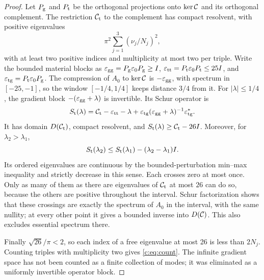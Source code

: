 \begin{proof}
Let $P_{\rm g}$ and $P_{\rm t}$ be the orthogonal projections onto $\ker\mathcal C$ and its
orthogonal complement. The restriction $\mathcal C_{\rm t}$ to the complement has compact resolvent, with positive eigenvalues
\[
 \pi^2\sum_{j=1}^3(\nu_j/N_j)^2,
\]
with at least two positive indices and multiplicity at most two per
triple. Write the bounded material blocks as
$\varepsilon_{\rm gg}=P_{\rm g}\varepsilon_0P_{\rm g}\ge I$, $\varepsilon_{\rm tt}=P_{\rm t}\varepsilon_0P_{\rm t}\le25I$, and
$\varepsilon_{\rm tg}=P_{\rm t}\varepsilon_0P_{\rm g}$. The compression of $A_0$ to $\ker\mathcal C$ is
$-\varepsilon_{\rm gg}$, with spectrum in $[-25,-1]$, so the window $[-1/4,1/4]$ keeps
distance $3/4$ from it. For $|\lambda|\le1/4$, the gradient block
$-(\varepsilon_{\rm gg}+\lambda)$ is invertible. Its Schur operator is
\begin{equation}
 S_{\rm t}(\lambda)=\mathcal C_{\rm t}-\varepsilon_{\rm tt}-\lambda+\varepsilon_{\rm tg}(\varepsilon_{\rm gg}+\lambda)^{-1}\varepsilon_{\rm tg}^*.
                                                               \label{c:eq:transverseschur}
\end{equation}
It has domain $D(\mathcal C_{\rm t})$, compact resolvent, and
$S_{\rm t}(\lambda)\ge\mathcal C_{\rm t}-26I$. Moreover, for $\lambda_2>\lambda_1$,
\[
 S_{\rm t}(\lambda_2)\le S_{\rm t}(\lambda_1)-(\lambda_2-\lambda_1)I.
\]
Its ordered eigenvalues are continuous by the bounded-perturbation
min--max inequality and strictly decrease in this sense. Each crosses
zero at most once. Only as many of them as there are eigenvalues of $\mathcal C_{\rm t}$ at most $26$ can do so, because the others
are positive throughout the interval. Schur factorization shows that
these crossings are exactly the spectrum of $A_0$ in the interval, with
the same nullity; at every other point it gives a bounded inverse into
$D(\mathcal C)$. This also excludes essential spectrum there.

Finally $\sqrt{26}/\pi<2$, so each index of a free eigenvalue at most
26 is less than $2N_j$. Counting triples with multiplicity two gives
\eqref{c:eq:count}. The infinite gradient space has not been counted as a
finite collection of modes; it was eliminated as a uniformly invertible
operator block.
\end{proof}

